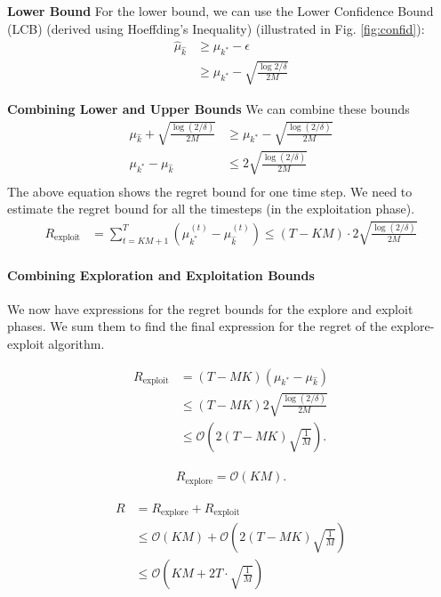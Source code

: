 \documentclass[11pt]{article}
\begin{document}
\textbf{Lower Bound} For the lower bound, we can use the Lower Confidence Bound (LCB) (derived using Hoeffding's Inequality) (illustrated
in Fig. \ref{fig:confid}):
\begin{align*}
\hat{\mu}_{\hat{k}} &\geq \mu_{k^*} - \epsilon\\
&\geq \mu_{k^*} - \sqrt{\frac{\log{2/\delta}}{2M}}
\end{align*}

\textbf{Combining Lower and Upper Bounds} We can combine these bounds 
\begin{align*}
\mu_{\hat{k}} + \sqrt{\frac{\log (2/\delta)}{2M}} &\geq \mu_{k^*} - \sqrt{\frac{\log (2/\delta)}{2M}}\\
\mu_{k^*} - \mu_{\hat{k}} &\leq 2 \sqrt{\frac{\log (2/\delta)}{2M}}\\
\end{align*}
The above equation shows the regret bound for one time step. We need to estimate the regret bound for all the timesteps (in the exploitation phase).
\begin{align*}
R_{\text{exploit}} &= \sum_{t=KM+1}^T (\mu_{k^*}^{(t)} - \mu_{\hat{k}}^{(t)}) \leq (T - KM) \cdot 2 \sqrt{\frac{\log (2/\delta)}{2M}}
\end{align*}

\paragraph{Combining Exploration and Exploitation Bounds}
We now have expressions for the regret bounds for the explore and exploit phases. We sum them to find the final expression for the regret of the explore-exploit algorithm.

\begin{align*}
    R_{\text{exploit}} &= (T-MK)(\mu_{k^{\ast}} - \mu_{\widehat{k}})\\
    &\leq (T-MK)2\sqrt{\frac{\log(2/\delta)}{2M}}\\
    &\leq \mathcal{O}\left(2(T-MK) \sqrt{\frac{1}{M}}\right).
\end{align*}

\begin{align*}
R_{\text{explore}} = \mathcal{O}(KM).
\end{align*}

\begin{align*}
    R &= R_{\text{explore}} + R_{\text{exploit}} \\
    &\leq \mathcal{O}(KM) +  \mathcal{O}\left(2(T-MK) \sqrt{\frac{1}{M}}\right)\\
    &\leq \mathcal{O}\left(KM + 2T \cdot \sqrt{\frac{1}{M}}\right)
\end{align*}
\end{document}
